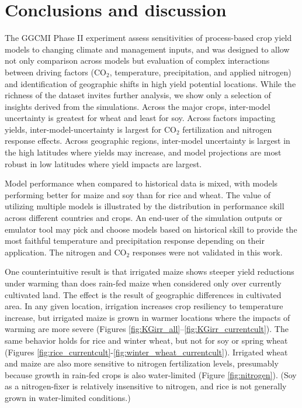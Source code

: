 \documentclass[preprint, 5p, times, twocolumn]{elsarticle}
\begin{document}
{\section{Conclusions and discussion} 
\label{S:4}
The GGCMI Phase II experiment assess sensitivities of process-based crop yield models to changing climate and management inputs, and was designed to allow not only comparison across models but evaluation of complex interactions between driving factors (CO$_2$, temperature, precipitation, and applied nitrogen) and identification of geographic shifts in high yield potential locations. While the richness of the dataset invites further analysis, we show only a selection of insights derived from the simulations. Across the major crops, inter-model uncertainty is greatest for wheat and least for soy. Across factors impacting yields, inter-model-uncertainty is largest for CO$_2$ fertilization and nitrogen response effects. Across geographic regions, inter-model uncertainty is largest in the high latitudes where yields may increase, and model projections are most robust in low latitudes where yield impacts are largest.  

Model performance when compared to historical data is mixed, with models performing better for maize and soy than for rice and wheat. The value of utilizing multiple models is illustrated by the distribution in performance skill across different countries and crops. An end-user of the simulation outputs or emulator tool may pick and choose models based on historical skill to provide the most faithful temperature and precipitation response depending on their application. The nitrogen and CO$_2$ responses were not validated in this work.

One counterintuitive result is that irrigated maize shows steeper yield reductions under warming than does rain-fed maize when considered only over currently cultivated land. The effect is the result of geographic differences in cultivated area. In any given location, irrigation increases crop resiliency to temperature increase, but irrigated maize is grown in warmer locations where the impacts of warming are more severe (Figures \ref{fig:KGirr_all}--\ref{fig:KGirr_currentcult}). The same behavior holds for rice and winter wheat, but not for soy or spring wheat (Figures \ref{fig:rice_currentcult}-\ref{fig:winter_wheat_currentcult}). Irrigated wheat and maize are also more sensitive to nitrogen fertilization levels, presumably because growth in rain-fed crops is also water-limited (Figure \ref{fig:nitrogen}). (Soy as a nitrogen-fixer is relatively insensitive to nitrogen, and rice is not generally grown in water-limited conditions.)

}
\end{document}
